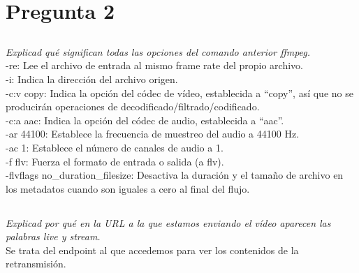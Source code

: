 \documentclass[spanish]{article}
\begin{document}
\section{Pregunta 2}

\subsection{}

\textit{Explicad qué significan todas las opciones del
comando anterior ffmpeg.}\\

-re: Lee el archivo de entrada al mismo frame rate del
propio archivo.\\

-i: Indica la dirección del archivo origen.\\

-c:v copy: Indica la opción del códec de vídeo, establecida a
``copy'', así que no se producirán operaciones de
decodificado/filtrado/codificado.\\

-c:a aac: Indica la opción del códec de audio, establecida a
``aac''.\\

-ar 44100: Establece la frecuencia de muestreo del audio a
44100 Hz.\\

-ac 1: Establece el número de canales de audio a 1.\\

-f flv: Fuerza el formato de entrada o salida (a flv).\\

-flvflags no\_duration\_filesize: Desactiva la duración y el
tamaño de archivo en los metadatos cuando son iguales a cero
al final del flujo.

\subsection{}

\textit{Explicad por qué en la URL a la que estamos enviando
el vídeo aparecen las palabras live y stream.}\\

Se trata del endpoint al que accedemos para ver los
contenidos de la retransmisión.

\subsection{}
\end{document}
